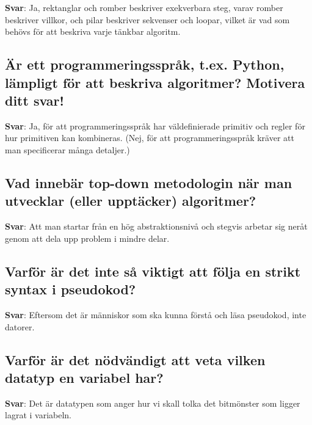 \documentclass[a4paper,11pt,oneside]{article}
\begin{document}
\begin{sloppypar}
\label{q:187:sa:sv:True}

\textbf{Svar}: Ja, rektanglar och romber beskriver exekverbara steg, varav romber beskriver villkor, och pilar beskriver sekvenser och loopar, vilket \"ar vad som beh\"ovs f\"or att beskriva varje t\"ankbar algoritm.



\subsection{\"Ar ett programmeringsspr\r{a}k, t.ex. Python, l\"ampligt f\"or att beskriva algoritmer? Motivera ditt svar!}

\label{q:188:sa:sv:True}

\textbf{Svar}: Ja, f\"or att programmeringsspr\r{a}k har v\"aldefinierade primitiv och regler f\"or hur primitiven kan kombineras. (Nej, f\"or att programmeringsspr\r{a}k kr\"aver att man specificerar m\r{a}nga detaljer.)



\subsection{Vad inneb\"ar top-down metodologin n\"ar man utvecklar (eller uppt\"acker) algoritmer?}

\label{q:189:sa:sv:True}

\textbf{Svar}: Att man startar fr\r{a}n en h\"og abstraktionsniv\r{a} och stegvis arbetar sig ner\r{a}t genom att dela upp problem i mindre delar.



\subsection{Varf\"or \"ar det inte s\r{a} viktigt att f\"olja en strikt syntax i pseudokod?}

\label{q:190:sa:sv:True}

\textbf{Svar}: Eftersom det \"ar m\"anniskor som ska kunna f\"orst\r{a} och l\"asa pseudokod, inte datorer.



\subsection{Varf\"or \"ar det n\"odv\"andigt att veta vilken datatyp en variabel har?}

\label{q:191:sa:sv:True}

\textbf{Svar}: Det \"ar datatypen som anger hur vi skall tolka det bitm\"onster som ligger lagrat i variabeln.




\end{sloppypar}
\end{document}
